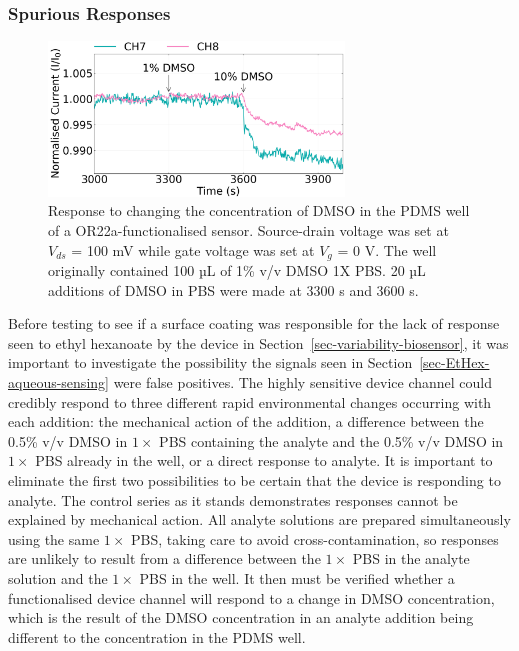 \documentclass[
  a4paper,
]{scrbook}
\begin{document}
\hypertarget{spurious-responses}{%
\subsubsection*{Spurious Responses}\label{spurious-responses}}

\begin{figure}

{\centering \includegraphics[width=0.7\textwidth,height=\textheight]{figures/ch8/NGW4_D7_OR22aliposome_sampling_220623_detrend_trunc_arrows_normalised.png}

}

\caption{\label{fig-DMSO-concentration}Response to changing the
concentration of DMSO in the PDMS well of a OR22a-functionalised sensor.
Source-drain voltage was set at \(V_{ds}\) = 100 mV while gate voltage
was set at \(V_g\) = 0 V. The well originally contained 100 µL of 1\%
v/v DMSO 1X PBS. 20 µL additions of DMSO in PBS were made at 3300 s and
3600 s.}

\end{figure}

Before testing to see if a surface coating was responsible for the lack
of response seen to ethyl hexanoate by the device in
Section~\ref{sec-variability-biosensor}, it was important to investigate
the possibility the signals seen in
Section~\ref{sec-EtHex-aqueous-sensing} were false positives. The highly
sensitive device channel could credibly respond to three different rapid
environmental changes occurring with each addition: the mechanical
action of the addition, a difference between the 0.5\% v/v DMSO in
\(1 \times\) PBS containing the analyte and the 0.5\% v/v DMSO in
\(1 \times\) PBS already in the well, or a direct response to analyte.
It is important to eliminate the first two possibilities to be certain
that the device is responding to analyte. The control series as it
stands demonstrates responses cannot be explained by mechanical action.
All analyte solutions are prepared simultaneously using the same
\(1 \times\) PBS, taking care to avoid cross-contamination, so responses
are unlikely to result from a difference between the \(1 \times\) PBS in
the analyte solution and the \(1 \times\) PBS in the well. It then must
be verified whether a functionalised device channel will respond to a
change in DMSO concentration, which is the result of the DMSO
concentration in an analyte addition being different to the
concentration in the PDMS well.
\end{document}
